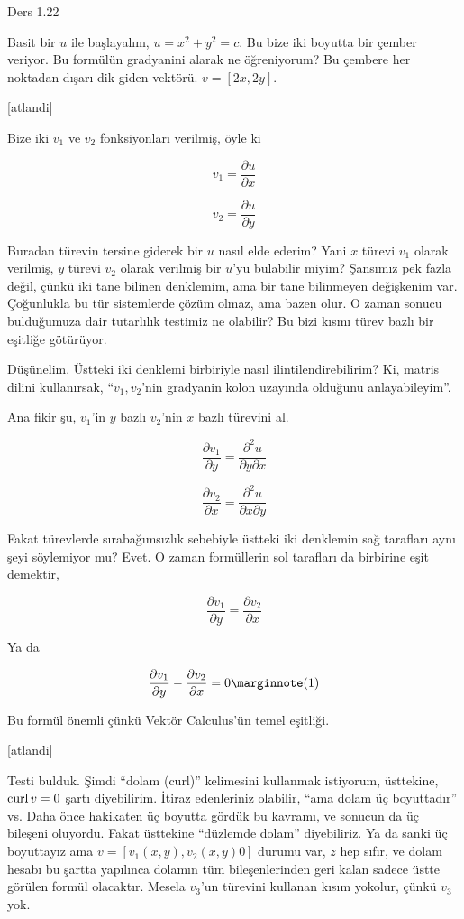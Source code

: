\documentclass[12pt,fleqn]{article}\usepackage{../../common}
\begin{document}
Ders 1.22

Basit bir $u$ ile başlayalım, $u = x^2 + y^2 = c$. Bu bize iki boyutta bir
çember veriyor. Bu formülün gradyanini alarak ne öğreniyorum? Bu çembere her
noktadan dışarı dik giden vektörü. $v = [2x, 2y]$.

[atlandi]

Bize iki $v_1$ ve $v_2$ fonksiyonları verilmiş, öyle ki

$$
v_1 = \frac{\partial u}{\partial x}
$$

$$
v_2 = \frac{\partial u}{\partial y}
$$

Buradan türevin tersine giderek bir $u$ nasıl elde ederim? Yani $x$ türevi $v_1$
olarak verilmiş, $y$ türevi $v_2$ olarak verilmiş bir $u$'yu bulabilir miyim?
Şansımız pek fazla değil, çünkü iki tane bilinen denklemim, ama bir tane
bilinmeyen değişkenim var. Çoğunlukla bu tür sistemlerde çözüm olmaz, ama bazen
olur. O zaman sonucu bulduğumuza dair tutarlılık testimiz ne olabilir?
Bu bizi kısmı türev bazlı bir eşitliğe götürüyor.

Düşünelim. Üstteki iki denklemi birbiriyle nasıl ilintilendirebilirim? Ki,
matris dilini kullanırsak, ``$v_1,v_2$'nin gradyanin kolon uzayında olduğunu
anlayabileyim''. 

Ana fikir şu, $v_1$'in $y$ bazlı $v_2$'nin $x$ bazlı türevini al.

$$
\frac{\partial v_1}{\partial y} = \frac{\partial^2 u}{\partial y \partial x}
$$

$$
\frac{\partial v_2}{\partial x} = \frac{\partial^2 u}{\partial x \partial y}
$$

Fakat türevlerde sırabağımsızlık sebebiyle üstteki iki denklemin sağ tarafları
aynı şeyi söylemiyor mu? Evet. O zaman formüllerin sol tarafları da birbirine
eşit demektir,

$$
\frac{\partial v_1}{\partial y} = \frac{\partial v_2}{\partial x} 
$$

Ya da

$$
\frac{\partial v_1}{\partial y} - \frac{\partial v_2}{\partial x} = 0
\mlabel{1}
$$

Bu formül önemli çünkü Vektör Calculus'ün temel eşitliği.

[atlandi]

Testi bulduk. Şimdi ``dolam (curl)'' kelimesini kullanmak istiyorum, üsttekine,
$\operatorname{curl} v = 0$ şartı diyebilirim. İtiraz edenleriniz olabilir, ``ama dolam üç
boyuttadır'' vs. Daha önce hakikaten üç boyutta gördük bu kavramı, ve sonucun da
üç bileşeni oluyordu. Fakat üsttekine ``düzlemde dolam'' diyebiliriz.  Ya da
sanki üç boyuttayız ama $v = [v_1(x,y), v_2(x,y) 0]$ durumu var, $z$ hep sıfır,
ve dolam hesabı bu şartta yapılınca dolamın tüm bileşenlerinden geri kalan
sadece üstte görülen formül olacaktır. Mesela $v_3$'un türevini kullanan kısım
yokolur, çünkü $v_3$ yok.
\end{document}
